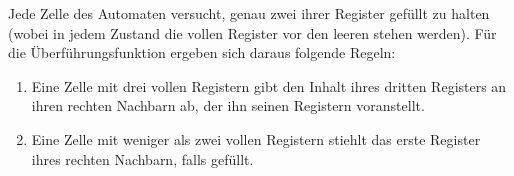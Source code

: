 \documentclass{article}
\begin{document}
Jede Zelle des Automaten versucht, genau zwei ihrer Register gefüllt zu halten (wobei in jedem Zustand die vollen Register vor den leeren stehen werden). Für die Überführungsfunktion ergeben sich daraus folgende Regeln:
\begin{enumerate}
    \item Eine Zelle mit drei vollen Registern gibt den Inhalt ihres dritten Registers an ihren rechten Nachbarn ab, der ihn seinen Registern voranstellt.
        \begin{center}
        \end{center}
    \item Eine Zelle mit weniger als zwei vollen Registern stiehlt das erste Register ihres rechten Nachbarn, falls gefüllt.
        \begin{center}
        \end{center}
\end{enumerate}
\end{document}
